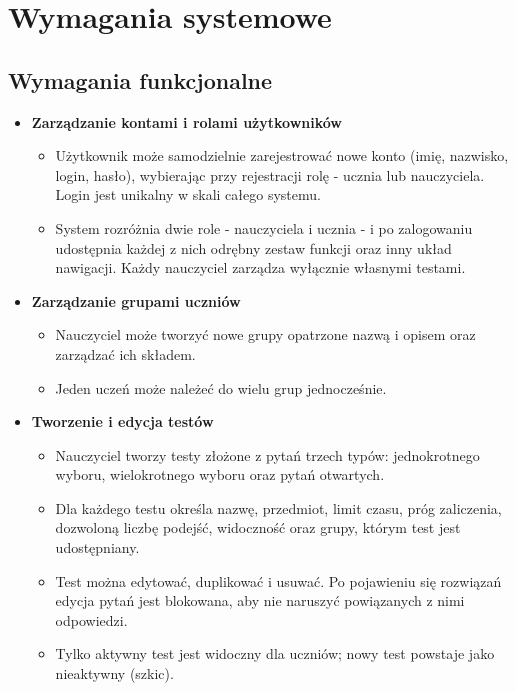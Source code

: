 ﻿\chapter{Wymagania systemowe}
\label{cha:wymagania}

\section{Wymagania funkcjonalne}
\label{sec:wymaganiaFunkcjonalne}

\begin{itemize}
  \item \textbf{Zarządzanie kontami i rolami użytkowników}
  \begin{itemize}
    \item Użytkownik może samodzielnie zarejestrować nowe konto (imię, nazwisko, login, hasło),
          wybierając przy rejestracji rolę - ucznia lub nauczyciela. Login jest unikalny w skali
          całego systemu.
    \item System rozróżnia dwie role - nauczyciela i ucznia - i po zalogowaniu udostępnia każdej
          z nich odrębny zestaw funkcji oraz inny układ nawigacji. Każdy nauczyciel zarządza
          wyłącznie własnymi testami.
  \end{itemize}

  \item \textbf{Zarządzanie grupami uczniów}
  \begin{itemize}
    \item Nauczyciel może tworzyć nowe grupy opatrzone nazwą i opisem oraz zarządzać ich składem.
    \item Jeden uczeń może należeć do wielu grup jednocześnie.
  \end{itemize}

  \item \textbf{Tworzenie i edycja testów}
  \begin{itemize}
    \item Nauczyciel tworzy testy złożone z pytań trzech typów: jednokrotnego wyboru, wielokrotnego
          wyboru oraz pytań otwartych.
    \item Dla każdego testu określa nazwę, przedmiot, limit czasu, próg zaliczenia, dozwoloną liczbę
          podejść, widoczność oraz grupy, którym test jest udostępniany.
    \item Test można edytować, duplikować i usuwać. Po pojawieniu się rozwiązań edycja pytań jest
          blokowana, aby nie naruszyć powiązanych z nimi odpowiedzi.
    \item Tylko aktywny test jest widoczny dla uczniów; nowy test powstaje jako nieaktywny (szkic).
  \end{itemize}


\end{itemize}
